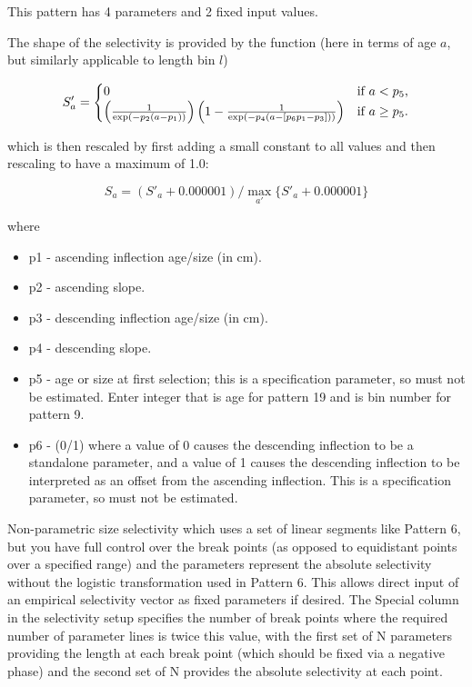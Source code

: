 \hypertarget{SimpleDoubleLog}{}

This pattern has 4 parameters and 2 fixed input values.

The shape of the selectivity is provided by the function (here in terms of age $a$, but similarly applicable to length bin $l$)

\begin{equation}
    S'_a =  
    \begin{cases}
      \hfil 0 & \text{if $a < p_5$,} \\
      \left( \frac{1}{\exp\left(-p_2 \left( a - p_1 \right) \right) } \right)
      \left(1 - \frac{1}{\exp\left(-p_4 \left( a - [p_6 p_1 - p_3]\right) \right) } \right)
      & \text{if $a \geq p_5$.}
    \end{cases}
 \end{equation}

which is then rescaled by first adding a small constant to all values and then rescaling to have a maximum of 1.0:
 
 \begin{equation}
    S_a = (S'_a + 0.000001) / \max_{a'}\{S'_a + 0.000001\}
 \end{equation}

where
	\begin{itemize}
		\item p1 - ascending inflection age/size (in cm).
		\item p2 - ascending slope. 
		\item p3 - descending inflection age/size (in cm).
		\item p4 - descending slope.
		\item p5 - age or size at first selection; this is a specification parameter, so must not be estimated. Enter integer that is age for pattern 19 and is bin number for pattern 9.
		\item p6 - (0/1) where a value of 0 causes the descending inflection to be a standalone parameter, and a value of 1 causes the descending inflection to be interpreted as an offset from the ascending inflection. This is a specification parameter, so must not be estimated.
	\end{itemize}

\hypertarget{NonParamSelectivity21}{}
Non-parametric size selectivity which uses a set of linear segments like Pattern 6, but you have full control over the break points (as opposed to equidistant points over a specified range) and the parameters represent the absolute selectivity without the logistic transformation used in Pattern 6. This allows direct input of an empirical selectivity vector as fixed parameters if desired. The Special column in the selectivity setup specifies the number of break points where the required number of parameter lines is twice this value, with the first set of N parameters providing the length at each break point (which should be fixed via a negative phase) and the second set of N provides the absolute selectivity at each point. 

